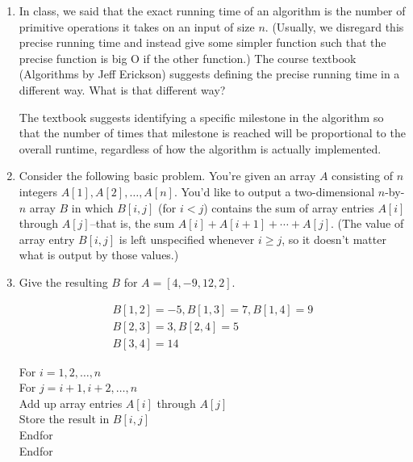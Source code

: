 \documentclass[11pt]{article}
\begin{document}



\begin{enumerate}

\item  In class, we said that the exact running time of an algorithm is the number of primitive operations it
takes on an input of size $n$. (Usually, we disregard this precise running time and instead give some simpler function
such that the precise function is big O if the other function.)
The course textbook (Algorithms by Jeff Erickson) suggests defining the precise running time in a different way.
What is that different way?

\begin{Solution}
    The textbook suggests identifying a specific milestone in the algorithm so that the number of times that milestone
    is reached will be proportional to the overall runtime, regardless of how the algorithm is actually implemented.
\end{Solution}

\item

Consider the following basic problem. You're given an array $A$ consisting of
$n$ integers $A[1], A[2], \ldots, A[n]$. You'd like to output a two-dimensional
$n$-by-$n$ array $B$ in which $B[i,j]$ (for $i < j$) contains the sum of array
entries $A[i]$ through $A[j]$--that is, the sum $A[i] + A[i+1] + \cdots + A[j]$.
(The value of array entry $B[i,j]$ is left unspecified whenever $i \geq j$, so
it doesn't matter what is output by those values.)

\item  Give the resulting $B$ for $A=[4, -9, 12, 2]$.

\begin{Solution}
    \begin{align*}
B[1,2] = -5, B[1,3] = 7, B[1,4] = 9\\
B[2,3] = 3, B[2,4] = 5 \\
B[3,4] = 14
    \end{align*}



\end{Solution}

\begin{algo}
   For $i = 1, 2, \ldots, n$\+ \\
   For $j = i + 1, i + 2, \ldots, n$\+ \\
   Add up array entries $A[i]$ through $A[j]$\\
   Store the result in $B[i,j]$\- \\
   Endfor\- \\
   Endfor
\end{algo}


\end{enumerate}
\end{document}
